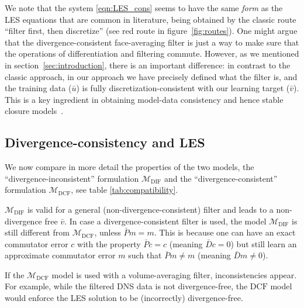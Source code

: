 \documentclass[preprint]{elsarticle}
\begin{document}
We note that the system \eqref{eqn:LES_cons} seems to have the same
\textit{form} as the LES equations that are common in literature, being obtained
by the classic route ``filter first, then discretize'' (see red route in
figure~\ref{fig:routes}).
One might argue that the divergence-consistent face-averaging
filter is just a way to make sure that the operations of differentiation and
filtering commute. However, as we mentioned in section~\ref{sec:introduction},
there is an important difference: in contrast to the classic approach, in our
approach we have precisely defined what the filter is, and the training data
($\bar{u}$) is fully discretization-consistent with our learning target
($\bar{v}$). This is a key ingredient in obtaining model-data consistency and
hence stable closure models~\cite{Duraisamy2021,Kurz2021}.

\subsection{Divergence-consistency and LES}

We now compare in more detail the properties of the two models, the
``divergence-inconsistent'' formulation $\mathcal{M}_{\text{DIF}}$ and the
``divergence-consistent'' formulation $\mathcal{M}_{\text{DCF}}$,
see table \ref{tab:compatibility}.

$\mathcal{M}_{\text{DIF}}$ is valid for a general (non-divergence-consistent) filter
and leads to a non-divergence free $\bar{v}$. In case a divergence-consistent
filter is used, the model $\mathcal{M}_{\text{DIF}}$ is still different from
$\mathcal{M}_{\text{DCF}}$, unless $\bar{P} m = m$. This is because one can have an
exact commutator error $c$ with the property $\bar{P} c = c$ (meaning $\bar{D} c
= 0$) but still learn an approximate commutator error $m$ such that $\bar{P} m
\neq m$ (meaning $\bar{D} m \neq 0$). 

If the $\mathcal{M}_{\text{DCF}}$ model is used
with a volume-averaging filter, inconsistencies appear. For example, while the
filtered DNS data is not divergence-free, the $\text{DCF}$ model would enforce the
LES solution to be (incorrectly) divergence-free.
\end{document}
